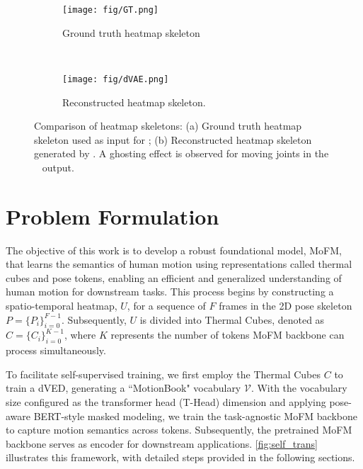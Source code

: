 \begin{figure*}[h]
    \centering
    \begin{subfigure}[b]{\textwidth}
        \texttt{[image: fig/GT.png]}
        \caption{Ground truth heatmap skeleton}
        \label{fig:gt}
    \end{subfigure}
    \\
    \begin{subfigure}[b]{\textwidth}
        \texttt{[image: fig/dVAE.png]}
        \caption{Reconstructed heatmap skeleton.}
        \label{fig:dvae}
    \end{subfigure}
    \caption{Comparison of heatmap skeletons: (a) Ground truth heatmap skeleton used as input for \dV; (b) Reconstructed heatmap skeleton generated by \dV. A ghosting effect is observed for moving joints in the \dV~ output.}
    \label{fig:combined_frames}
\end{figure*}

\section{Problem Formulation}
The objective of this work is to develop a robust foundational model, MoFM, that learns the semantics of human motion using representations called thermal cubes and pose tokens, enabling an efficient and generalized understanding of human motion for downstream tasks. This process begins by constructing a spatio-temporal heatmap, \( U \), for a sequence of \( F \) frames in the 2D pose skeleton \( P = \{P_i\}_{i=0}^{F-1} \). Subsequently, \( U \) is divided into Thermal Cubes, denoted as \( C = \{C_i\}_{i=0}^{K-1} \), where \( K \) represents the number of tokens MoFM backbone can process simultaneously. 

To facilitate self-supervised training, we first employ the Thermal Cubes \( C \) to train a dVED, generating a ``MotionBook" vocabulary \(\mathcal{V}\). With the vocabulary size configured as the transformer head (T-Head) dimension and applying pose-aware BERT-style masked modeling, we train the task-agnostic MoFM backbone to capture motion semantics across tokens. Subsequently, the pretrained MoFM backbone serves as encoder for downstream applications. \cref{fig:self_trans} illustrates this framework, with detailed steps provided in the following sections.

